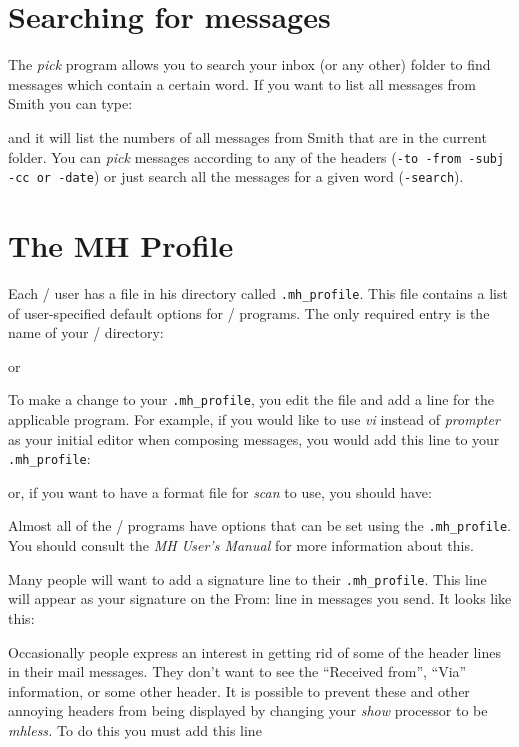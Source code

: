 

\section{Searching for messages}

The {\it pick\/} program allows you to search your inbox (or any other)
folder to find messages which contain a certain word.  If you want to 
list all messages from Smith you can type:


and it will list the numbers of all messages from Smith that are in the
current folder.  You can {\it pick\/} messages according to any of the
headers ({\tt -to -from -subj -cc {\rm or} -date}) or just search all the
messages for a given word ({\tt -search}).

\section{The MH Profile}

Each \MH/ user has a file in his directory called \verb|.mh_profile|.  This
file contains a list of user-specified default options for \MH/ programs.
The only required
entry is the name of your \MH/
directory:

or

To make a change to your \verb|.mh_profile|, you edit the file and add a
line for the applicable program.  For example, if you would like to use {\it
vi\/} instead of {\it prompter\/} as your initial editor when composing
messages, you would add this line to your \verb|.mh_profile|:


or, if you want to have a format file for {\it scan\/} to use, you should
have:


Almost all of the \MH/ programs have options that can be set using the
\verb|.mh_profile|. You should consult the {\sl MH User's Manual\/}
for more information about this.

Many people will want to add a signature line to their \verb|.mh_profile|.
This line  will appear as your signature on the From: line in messages
you send. It looks like this:



Occasionally people express an interest in getting rid of some of the
header lines in their mail messages.  They don't want to see the
``Received from'', ``Via'' information, or some other header.  It
is possible to prevent these and other annoying headers from being
displayed by changing your {\it show\/} processor to be {\it mhless.}
To do this you must add this line 

